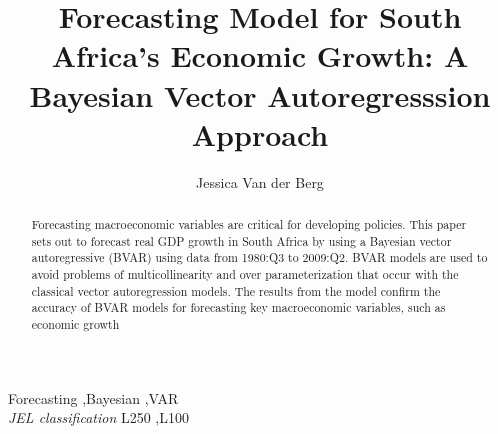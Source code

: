 \documentclass[11pt,preprint, authoryear]{elsarticle}
\numberwithin{equation}{section}
\numberwithin{figure}{section}
\numberwithin{table}{section}
\begin{document}
\begin{frontmatter}  %

\title{Forecasting Model for South Africa's Economic Growth: A Bayesian
Vector Autoregresssion Approach}





\author[Add1]{Jessica Van der Berg}





\address[Add1]{Stelenbosch University, South Africa}


\begin{abstract}
\small{
Forecasting macroeconomic variables are critical for developing
policies. This paper sets out to forecast real GDP growth in South
Africa by using a Bayesian vector autoregressive (BVAR) using data from
1980:Q3 to 2009:Q2. BVAR models are used to avoid problems of
multicollinearity and over parameterization that occur with the
classical vector autoregression models. The results from the model
confirm the accuracy of BVAR models for forecasting key macroeconomic
variables, such as economic growth
}
\end{abstract}

\vspace{1cm}


\begin{keyword}
\footnotesize{
Forecasting \sep Bayesian \sep VAR \\
\vspace{0.3cm}
}
\footnotesize{
\textit{JEL classification} L250 \sep L100
}
\end{keyword}



\vspace{0.5cm}

\end{frontmatter}



\pagestyle{fancy}
\chead{}
\rhead{}
\lfoot{}
\lhead{}
\cfoot{}


\headsep 35pt %
\end{document}
